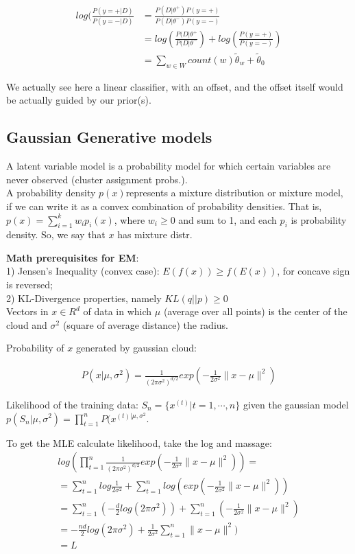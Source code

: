 \begin{align*}
log(\frac{P(y=+|D)}{P(y=-|D)} &= \frac{ P(D | \theta ^{+}) P(y = +)}{P(D | \theta ^{-}) P(y = -)}\\
&= log(\frac{P(D | \theta ^{+}}{P(D | \theta ^{-}}) + log(\frac{P(y = +)}{P(y = -)})\\
&= \sum_{w \in W} count(w) \tilde{\theta}_w + \tilde{\theta}_0
\end{align*}

We actually see here  a linear classifier, with an offset, and the offset itself
would be actually guided by our prior(s).

\subsection{Gaussian Generative models}

A latent variable model is a probability model for which certain variables
are never observed (cluster assignment probs.). \\

A probability density $p(x) $represents a mixture distribution or mixture
model, if we can write it as a convex combination of probability
densities. That is, $p(x) = \sum_{i=1}^{k}w_ip_i(x)$, where $w_i \ge 0$ and sum to 1,
and each $p_i$ is probability density. So, we say that $x$ has mixture distr.

\textbf{Math prerequisites for 	EM}:\\
1) Jensen's Inequality (convex case): $E(f(x)) \ge f(E(x))$, for concave sign is reversed;\\
2) KL-Divergence properties, namely $KL(q || p) \ge 0$\\

Vectors in $x \in R^d$  of data in which $\mu$ (average over all points) is the center of the cloud and $\sigma^2$ (square of average distance) the radius.

Probability of $x$ generated by gaussian cloud:

\begin{align*}
P(x | \mu , \sigma ^2) = \frac{1}{(2\pi \sigma ^2)^{d/2}} exp(-\frac{1}{2\sigma ^2} \|  x - \mu \| ^2)
\end{align*}

Likelihood of the training data: $S_n=\{x^{(t)}|t=1,\cdots,n\}$ given the gaussian model $p(S_n|\mu,\sigma^2)=\prod_{t=1}^n P(x^{(t)|\mu,\sigma^2}$.

To get the MLE calculate likelihood, take the log and massage:
\begin{align*}
log(\prod_{t=1}^n \frac{1}{(2\pi \sigma ^2)^{d/2}} exp(-\frac{1}{2\sigma ^2} \|  x - \mu \| ^2)) =\\
= \sum_{t=1}^n log \frac{1}{2\sigma ^2} + \sum_{t=1}^n log (exp(-\frac{1}{2\sigma ^2} \|  x - \mu \| ^2))\\
= \sum_{t=1}^n( -\frac{d}{2} log(2\pi\sigma^2)) + \sum_{t=1}^n (- \frac{1}{2\sigma^2}  \|  x - \mu \| ^2) \\
= -\frac{nd}{2}log(2\pi\sigma^2) + \frac{1}{2\sigma^2} \sum_{t=1}^n \|  x - \mu \| ^2) \\
= L
\end{align*}


